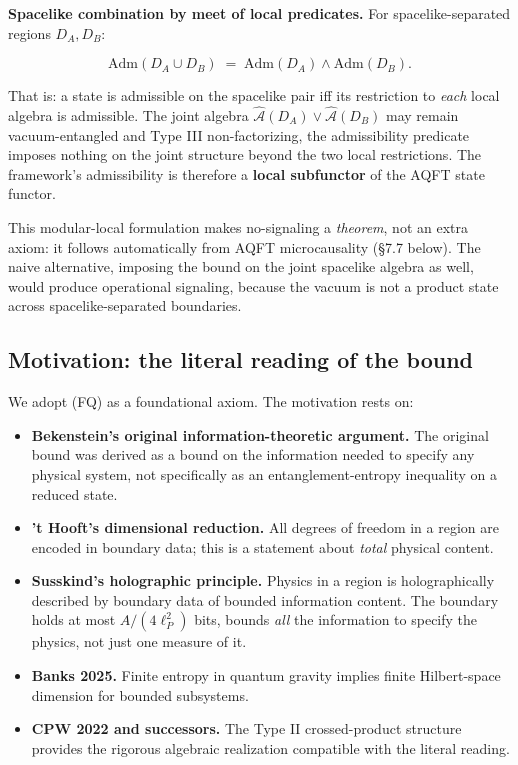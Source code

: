 \documentclass[11pt,a4paper]{article}
\begin{document}
\textbf{Spacelike combination by meet of local predicates.} For spacelike-separated regions $D_A, D_B$:

\[
\mathrm{Adm}(D_A \cup D_B) \;=\; \mathrm{Adm}(D_A) \wedge \mathrm{Adm}(D_B).
\]

That is: a state is admissible on the spacelike pair iff its restriction to \emph{each} local algebra is admissible. The joint algebra $\hat{\mathcal{A}}(D_A) \vee \hat{\mathcal{A}}(D_B)$ may remain vacuum-entangled and Type III non-factorizing, the admissibility predicate imposes nothing on the joint structure beyond the two local restrictions. The framework's admissibility is therefore a \textbf{local subfunctor} of the AQFT state functor.

This modular-local formulation makes no-signaling a \emph{theorem}, not an extra axiom: it follows automatically from AQFT microcausality (§7.7 below). The naive alternative, imposing the bound on the joint spacelike algebra as well, would produce operational signaling, because the vacuum is not a product state across spacelike-separated boundaries.

\subsection{Motivation: the literal reading of the bound}

We adopt (FQ) as a foundational axiom. The motivation rests on:

\begin{itemize}
  \item \textbf{Bekenstein's original information-theoretic argument.} The original bound was derived as a bound on the information needed to specify any physical system, not specifically as an entanglement-entropy inequality on a reduced state.
  \item \textbf{'t Hooft's dimensional reduction.} All degrees of freedom in a region are encoded in boundary data; this is a statement about \emph{total} physical content.
  \item \textbf{Susskind's holographic principle.} Physics in a region is holographically described by boundary data of bounded information content. The boundary holds at most $A/(4\ell_P^2)$ bits, bounds \emph{all} the information to specify the physics, not just one measure of it.
  \item \textbf{Banks 2025.} Finite entropy in quantum gravity implies finite Hilbert-space dimension for bounded subsystems.
  \item \textbf{CPW 2022 and successors.} The Type II crossed-product structure provides the rigorous algebraic realization compatible with the literal reading.
\end{itemize}
\end{document}

